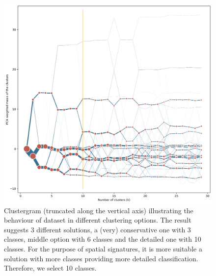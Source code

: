 \begin{figure}
    \includegraphics[width=\linewidth]{figures/clustergram_hou.png}
    \caption{Clustergram (truncated along the vertical axis) illustrating the behaviour
    of dataset in different clustering options. The result suggests 3 different
    solutions, a (very) conservative one with 3 classes, middle option with 6 classes
    and the detailed one with 10 classes. For the purpose of spatial signatures, it is
    more suitable a solution with more classes providing more detailed classification.
    Therefore, we select 10 classes.}
    \label{fig:cgram_hou}
\end{figure}

